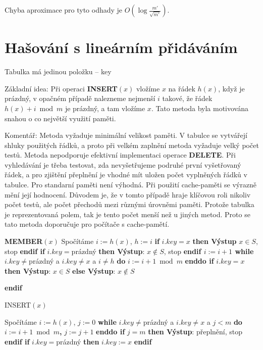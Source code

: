 \documentclass[a4paper,12pt]{article}
\begin{document}
Chyba aproximace pro tyto odhady je $O(\log\frac {m'}{\sqrt {
m'}})$.

\section{Hašování s lineárním přidáváním}

Tabulka má jedinou položku -- key

Základní idea:  Při operaci {\bf INSERT$(x)$} vložíme $
x$ 
na řádek $h(x)$, když je prázdný, v opačném případě 
nalezneme nejmenší $i$ takové, že řádek $h(x)+i\bmod 
m$ je 
prázdný, a tam vložíme $x$. Tato metoda byla motivována snahou o co největší využití paměti. 

Komentář:  Metoda vyžaduje minimální velikost paměti.  
V tabulce se vytvářejí shluky použitých řádků, a proto 
při velkém zaplnění metoda vyžaduje velký počet testů.  
Metoda nepodporuje efektivní implementaci operace {\bf DELETE}.  
Při vy\-hle\-dá\-vá\-ní je třeba testovat, zda nevyšetřujeme 
podruhé první vyšetřovaný řádek, a pro zjištění přeplnění je 
vhodné mít uložen počet vyplněných řádků v tabulce. Pro standarní paměti není výhodná. Při použití cache-paměti se výrazně mění její hodnocení. Důvodem je, že v tomto případě hraje klíčovou roli nikoliv počet testů, ale počet přechodů mezi různými úrovněmi paměti. Protože tabulka je reprezentovaná polem, tak je tento počet menší než u jiných metod. Proto se tato metoda doporučuje pro počítače s cache-pamětí.


{\bf MEMBER$(x)$}\newline 
Spočítáme $i:=h(x)$, $h:=i$\newline 
{\bf if} $i.key=x$ {\bf then Výstup} $x\in S$, stop {\bf endif\newline 
if} $i.key=$prázdný {\bf then {{\rm Výstup}}}: $x\notin S$, stop {\bf endif\newline 
$i:=i+1$\newline 
while} $i.key\ne$prázdný a $i.key\ne x$ a $i\ne h$ {\bf do} $
i:=i+1\bmod m$ {\bf enddo\newline 
if} $i.key=x$ {\bf then Výstup}: $x\in S$ {\bf else Výstup}: $
x\notin S$ {\bf endif


INSERT$(x)$}\newline 
Spočítáme $i:=h(x)$, $j:=0$\newline 
{\bf while} $i.key\ne$prázdný a $i.key\ne x$ a $j<m$ {\bf do} $
i:=i+1\bmod m${\bf ,} $j:=j+1$ {\bf enddo\newline 
if} $j=m$ {\bf then Výstup}: přeplnění, stop {\bf endif\newline 
if} $i.key=$prázdný {\bf then} $i.key:=x$ {\bf endif}
\end{document}
